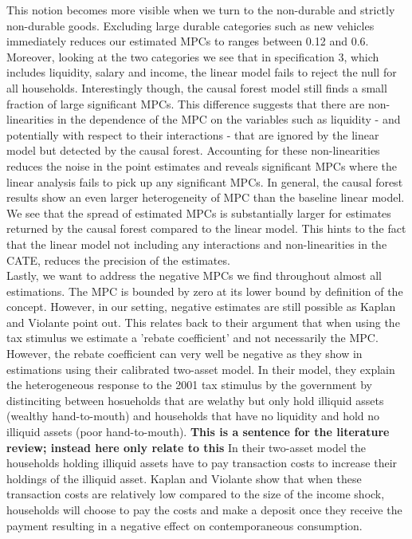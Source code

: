 This notion becomes more visible when we turn to the non-durable and strictly non-durable goods. Excluding large durable categories such as new vehicles immediately reduces our estimated MPCs to ranges between 0.12 and 0.6. Moreover, looking at the two categories we see that in specification 3, which includes liquidity, salary and income, the linear model fails to reject the null for all households. Interestingly though, the causal forest model still finds a small fraction of large significant MPCs. This difference suggests that there are non-linearities in the dependence of the MPC on the variables such as liquidity - and potentially with respect to their interactions - that are ignored by the linear model but detected by the causal forest. Accounting for these non-linearities reduces the noise in the point estimates and reveals significant MPCs where the linear analysis fails to pick up any significant MPCs. In general, the causal forest results show an even larger heterogeneity of MPC than the baseline linear model. We see that the spread of estimated MPCs is substantially larger for estimates returned by the causal forest compared to the linear model. This hints to the fact that the linear model not including any interactions and non-linearities in the CATE, reduces the precision of the estimates. \\
Lastly, we want to address the negative MPCs we find throughout almost all estimations. The MPC is bounded by zero at its lower bound by definition of the concept. However, in our setting, negative estimates are still possible as Kaplan and Violante point out. This relates back to their argument that when using the tax stimulus we estimate a 'rebate coefficient' and not necessarily the MPC. However, the rebate coefficient can very well be negative as they show in estimations using their calibrated two-asset model. In their model, they explain the heterogeneous response to the 2001 tax stimulus by the government by distinciting between hosueholds that are welathy but only hold illiquid assets (wealthy hand-to-mouth) and households that have no liquidity and hold no illiquid assets (poor hand-to-mouth). \textbf{This is a sentence for the literature review; instead here only relate to this} In their two-asset model the households holding illiquid assets have to pay transaction costs to increase their holdings of the illiquid asset. Kaplan and Violante show that when these transaction costs are relatively low compared to the size of the income shock, households will choose to pay the costs and make a deposit once they receive the payment resulting in a negative effect on contemporaneous consumption. 